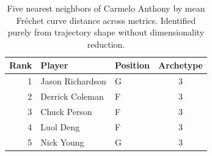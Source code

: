 \begin{table}[htbp]
  \centering\small
  \begin{tabular}{rllc}
    \toprule
    Rank & Player & Position & Archetype \\
    \midrule
    1 & Jason Richardson & G & 3 \\
    2 & Derrick Coleman & F & 3 \\
    3 & Chuck Person & F & 3 \\
    4 & Luol Deng & F & 3 \\
    5 & Nick Young & G & 3 \\
    \bottomrule
  \end{tabular}
  \caption{Five nearest neighbors of Carmelo Anthony by mean Fr\'{e}chet curve distance across metrics. Identified purely from trajectory shape without dimensionality reduction.}
  \label{tab:Carmelo_Anthony_frechet_curve_neighbors}
\end{table}

